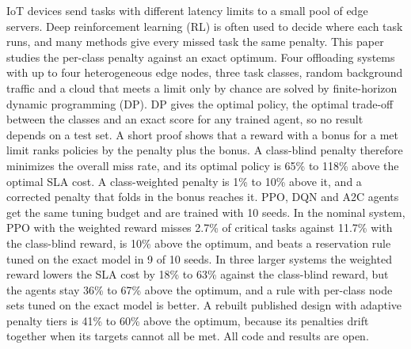 IoT devices send tasks with different latency limits to a small pool of edge servers. Deep reinforcement learning (RL) is often used to decide where each task runs, and many methods give every missed task the same penalty. This paper studies the per-class penalty against an exact optimum. Four offloading systems with up to four heterogeneous edge nodes, three task classes, random background traffic and a cloud that meets a limit only by chance are solved by finite-horizon dynamic programming (DP). DP gives the optimal policy, the optimal trade-off between the classes and an exact score for any trained agent, so no result depends on a test set. A short proof shows that a reward with a bonus for a met limit ranks policies by the penalty plus the bonus. A class-blind penalty therefore minimizes the overall miss rate, and its optimal policy is 65\% to 118\% above the optimal SLA cost. A class-weighted penalty is 1\% to 10\% above it, and a corrected penalty that folds in the bonus reaches it. PPO, DQN and A2C agents get the same tuning budget and are trained with 10 seeds. In the nominal system, PPO with the weighted reward misses 2.7\% of critical tasks against 11.7\% with the class-blind reward, is 10\% above the optimum, and beats a reservation rule tuned on the exact model in 9 of 10 seeds. In three larger systems the weighted reward lowers the SLA cost by 18\% to 63\% against the class-blind reward, but the agents stay 36\% to 67\% above the optimum, and a rule with per-class node sets tuned on the exact model is better. A rebuilt published design with adaptive penalty tiers is 41\% to 60\% above the optimum, because its penalties drift together when its targets cannot all be met. All code and results are open.
